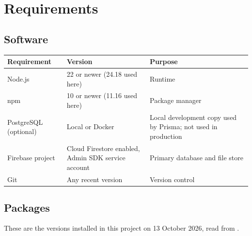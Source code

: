 \documentclass[11pt,a4paper]{article}
\begin{document}
\section{Requirements}
\subsection{Software}
\begin{center}
\begin{tabular}{@{}p{3.3cm}p{5.2cm}p{6.1cm}@{}}
\toprule
\textbf{Requirement} & \textbf{Version} & \textbf{Purpose}\\
\midrule
Node.js & 22 or newer (24.18 used here) & Runtime\\
npm & 10 or newer (11.16 used here) & Package manager\\
PostgreSQL (optional) & Local or Docker & Local development copy used by Prisma; not used in production\\
Firebase project & Cloud Firestore enabled, Admin SDK service account & Primary database and file store\\
Git & Any recent version & Version control\\
\bottomrule
\end{tabular}
\end{center}

\subsection{Packages}
These are the versions installed in this project on 13 October 2026, read from .
\end{document}
